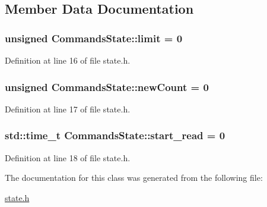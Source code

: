 \subsection{Member Data Documentation}
\subsubsection[{\texorpdfstring{limit}{limit}}]{\setlength{\rightskip}{0pt plus 5cm}unsigned Commands\+State\+::limit = 0}\hypertarget{class_commands_state_ae3cbeca97ad210a6980d5c44cf6adee2}{}\label{class_commands_state_ae3cbeca97ad210a6980d5c44cf6adee2}


Definition at line 16 of file state.\+h.

\subsubsection[{\texorpdfstring{new\+Count}{newCount}}]{\setlength{\rightskip}{0pt plus 5cm}unsigned Commands\+State\+::new\+Count = 0}\hypertarget{class_commands_state_a9d4a6edd6fc21c07150ec1bebf8516f4}{}\label{class_commands_state_a9d4a6edd6fc21c07150ec1bebf8516f4}


Definition at line 17 of file state.\+h.

\subsubsection[{\texorpdfstring{start\+\_\+read}{start_read}}]{\setlength{\rightskip}{0pt plus 5cm}std\+::time\+\_\+t Commands\+State\+::start\+\_\+read = 0}\hypertarget{class_commands_state_affdc3152f2776d90a04971104fea81af}{}\label{class_commands_state_affdc3152f2776d90a04971104fea81af}


Definition at line 18 of file state.\+h.



The documentation for this class was generated from the following file\+:\begin{DoxyCompactItemize}
\item 
\hyperlink{state_8h}{state.\+h}\end{DoxyCompactItemize}
